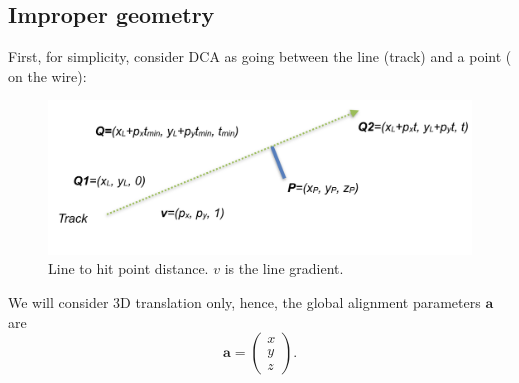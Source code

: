 \documentclass[a4paper,11pt]{article}
\begin{document}
\subsection{Improper geometry}

First, for simplicity, consider DCA as going between the line (track) and a point ( on the wire):
\begin{figure}[!ht]
\centering
\includegraphics[width=0.6\linewidth]{fig/HitLine.png}
\caption{Line to hit point distance. $v$ is the line gradient.}
\label{fig:HitLine}
\end{figure}

We will consider 3D translation only, hence, the global alignment parameters $\textbf{a}$ are
\begin{equation}
\textbf{a} = \begin{pmatrix}x \\y \\z \end{pmatrix}.
\end{equation}
\end{document}
